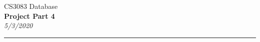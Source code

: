 \documentclass[12pt]{article}
\begin{document}
 
\setlength\parindent{0.1cm}
\begin{minipage}[b]{3.75in}
\begin{flushleft}
CS3083 Database\\ \textbf{Project Part 4} \\ \textit{5/3/2020} 
\end{flushleft}
\end{minipage}


\noindent \rule[1.6ex]{\linewidth}{0.6pt} 

\setlength\parindent{15pt}
\end{document}
